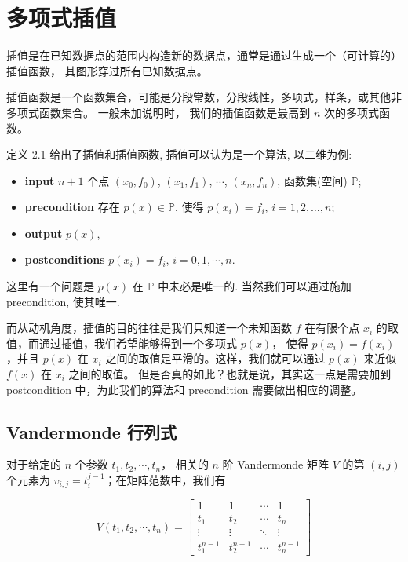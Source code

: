 \documentclass[a4paper]{ctexart}
\newcommand{\remark}[1]
{\noindent {\bf Remark {#1}}}
\begin{document}
\section{多项式插值}

 插值是在已知数据点的范围内构造新的数据点，通常是通过生成一个（可计算的）插值函数，
其图形穿过所有已知数据点。

 插值函数是一个函数集合，可能是分段常数，分段线性，多项式，样条，或其他非多项式函数集合。 
一般未加说明时， 我们的插值函数是最高到 $n$ 次的多项式函数。

\remark{2.1} 定义 2.1 给出了插值和插值函数, 插值可以认为是一个算法, 以二维为例:
\begin{itemize}
\item {\bf input} $n + 1$ 个点 $(x_0, f_0)$, $(x_1, f_1)$, $\cdots$, $(x_n, f_n)$, 函数集(空间) $\mathbb{P}$;
\item {\bf precondition} 存在 $p(x) \in \mathbb{P}$, 使得 $p(x_i) = f_i$, $i = 1, 2, \ldots, n$;
\item {\bf output} $p(x)$,
\item {\bf postconditions}  $p(x_i) = f_i$, $i = 0, 1, \cdots, n$.
\end{itemize}
这里有一个问题是 $p(x)$ 在 $\mathbb{P}$ 中未必是唯一的. 当然我们可以通过施加 precondition, 使其唯一. 

而从动机角度，插值的目的往往是我们只知道一个未知函数 $f$ 在有限个点 $x_i$ 的取值，而通过插值，我们希望能够得到一个多项式 $p(x)$，
使得 $p(x_i) = f(x_i)$，并且 $p(x)$ 在 $x_i$ 之间的取值是平滑的。这样，我们就可以通过 $p(x)$ 来近似 $f(x)$ 在 $x_i$ 之间的取值。
但是否真的如此？也就是说，其实这一点是需要加到 postcondition 中，为此我们的算法和 precondition 需要做出相应的调整。

\subsection{Vandermonde 行列式}

 对于给定的 $n$ 个参数 $t_1, t_2, \cdots, t_n$，
相关的 $n$ 阶 Vandermonde 矩阵 $V$ 的第 $(i, j)$ 个元素为 $v_{i,j} = t_{i}^{j-1}$；在矩阵范数中，我们有

\[
V (t_1 , t_2 , \cdots , t_n ) = \begin{bmatrix}
 1 & 1 & \cdots & 1 \\
 t_1 & t_2 & \cdots & t_n \\
 \vdots & \vdots & \ddots & \vdots \\
 t_1^{n-1} & t_2^{n-1} & \cdots & t_n^{n-1}
\end{bmatrix} \tag{2.1}
\]
\end{document}
